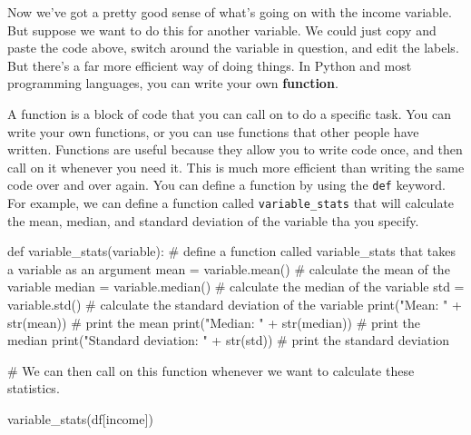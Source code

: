 \documentclass[
  letterpaper,
  DIV=11,
  numbers=noendperiod]{scrreprt}
\newenvironment{Shaded}{\begin{snugshade}}{\end{snugshade}}
\newcommand{\BuiltInTok}[1]{\textcolor[rgb]{0.00,0.23,0.31}{#1}}
\newcommand{\CommentTok}[1]{\textcolor[rgb]{0.37,0.37,0.37}{#1}}
\newcommand{\KeywordTok}[1]{\textcolor[rgb]{0.00,0.23,0.31}{#1}}
\newcommand{\NormalTok}[1]{\textcolor[rgb]{0.00,0.23,0.31}{#1}}
\newcommand{\OperatorTok}[1]{\textcolor[rgb]{0.37,0.37,0.37}{#1}}
\newcommand{\StringTok}[1]{\textcolor[rgb]{0.13,0.47,0.30}{#1}}
\begin{document}
Now we've got a pretty good sense of what's going on with the income
variable. But suppose we want to do this for another variable. We could
just copy and paste the code above, switch around the variable in
question, and edit the labels. But there's a far more efficient way of
doing things. In Python and most programming languages, you can write
your own \textbf{function}.

A function is a block of code that you can call on to do a specific
task. You can write your own functions, or you can use functions that
other people have written. Functions are useful because they allow you
to write code once, and then call on it whenever you need it. This is
much more efficient than writing the same code over and over again. You
can define a function by using the \texttt{def} keyword. For example, we
can define a function called \texttt{variable\_stats} that will
calculate the mean, median, and standard deviation of the variable tha
you specify.

\begin{Shaded}
\begin{Highlighting}[]
\KeywordTok{def}\NormalTok{ variable\_stats(variable): }\CommentTok{\# define a function called variable\_stats that takes a variable as an argument}
\NormalTok{    mean }\OperatorTok{=}\NormalTok{ variable.mean() }\CommentTok{\# calculate the mean of the variable}
\NormalTok{    median }\OperatorTok{=}\NormalTok{ variable.median() }\CommentTok{\# calculate the median of the variable}
\NormalTok{    std }\OperatorTok{=}\NormalTok{ variable.std() }\CommentTok{\# calculate the standard deviation of the variable}
    \BuiltInTok{print}\NormalTok{(}\StringTok{"Mean: "} \OperatorTok{+} \BuiltInTok{str}\NormalTok{(mean)) }\CommentTok{\# print the mean}
    \BuiltInTok{print}\NormalTok{(}\StringTok{"Median: "} \OperatorTok{+} \BuiltInTok{str}\NormalTok{(median)) }\CommentTok{\# print the median}
    \BuiltInTok{print}\NormalTok{(}\StringTok{"Standard deviation: "} \OperatorTok{+} \BuiltInTok{str}\NormalTok{(std)) }\CommentTok{\# print the standard deviation}
\end{Highlighting}
\end{Shaded}

\begin{Shaded}
\begin{Highlighting}[]
\CommentTok{\# We can then call on this function whenever we want to calculate these statistics. }

\NormalTok{variable\_stats(df[}\StringTok{\textquotesingle{}income\textquotesingle{}}\NormalTok{]) }
\end{Highlighting}
\end{Shaded}
\end{document}
